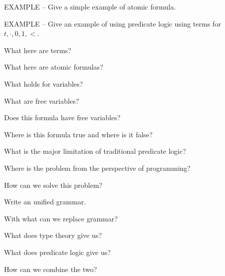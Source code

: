 \documentclass[fleqn]{article}
\begin{document}
\begin{enumerate}
    \item EXAMPLE -- Give a simple example of atomic formula.
    {\color{red}\item EXAMPLE -- Give an example of using predicate logic using terms for $t, \cdot, 0, 1, <$.}
    \begin{itemize}
        \item What here are terms?
        {\color{red}\item What here are atomic formulas?}
        \item What holds for variables?
        \item What are free variables?
        \item Does this formula have free variables?
        \item Where is this formula true and where is it false?
    \end{itemize} 
    {\color{red}\item What is the major limitation of traditional predicate logic?}
    {\color{blue}\item Where is the problem from the perspective of programming?}
    {\color{red}\item How can we solve this problem?}
    {\color{red}\item Write an unified grammar.}
    {\color{red}\item With what can we replace grammar?}
    {\color{blue}\item What does type theory give us?}
    {\color{red}\item What does predicate logic give us?}
    {\color{blue}\item How can we combine the two? }
\end{enumerate}
\end{document}
